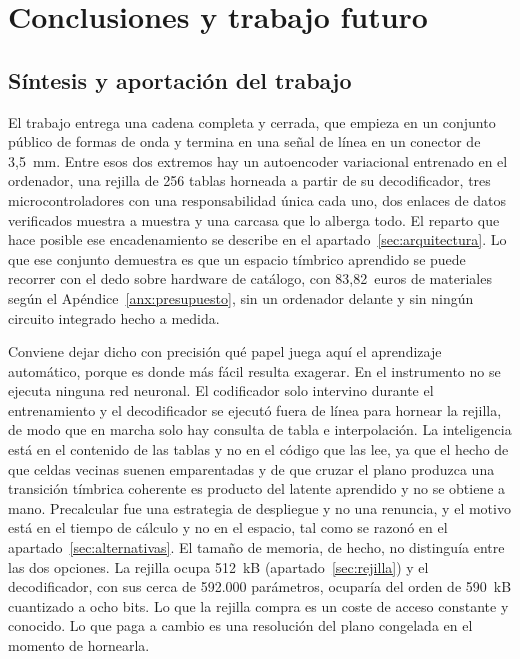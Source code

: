 \chapter{Conclusiones y trabajo futuro}
\label{cap:conclusiones}

\section{Síntesis y aportación del trabajo}
\hypertarget{RE3.2}{}\label{RE3.2}

El trabajo entrega una cadena completa y cerrada, que empieza en un conjunto
público de formas de onda y termina en una señal de línea en un conector de
3,5~mm. Entre esos dos extremos hay un autoencoder variacional entrenado en el
ordenador, una rejilla de 256 tablas horneada a partir
de su decodificador, tres microcontroladores con una responsabilidad única cada
uno, dos enlaces de datos verificados muestra a muestra y una carcasa que lo
alberga todo. El reparto que hace posible ese encadenamiento se describe en el
apartado~\ref{sec:arquitectura}. Lo que ese conjunto demuestra es que un espacio
tímbrico aprendido se puede recorrer con el dedo sobre hardware de catálogo, con
83,82~euros de materiales según el Apéndice~\ref{anx:presupuesto}, sin un
ordenador delante y sin ningún circuito integrado hecho a medida.

Conviene dejar dicho con precisión qué papel juega aquí el aprendizaje
automático, porque es donde más fácil resulta exagerar. En el instrumento no se
ejecuta ninguna red neuronal. El codificador solo intervino durante el
entrenamiento y el decodificador se ejecutó fuera de línea para hornear la
rejilla, de modo que en marcha solo hay consulta de tabla e interpolación. La
inteligencia está en el contenido de las tablas y no en el código que las lee,
ya que el hecho de que celdas vecinas suenen emparentadas y de que cruzar el
plano produzca una transición tímbrica coherente es producto del latente
aprendido y no se obtiene a mano. Precalcular fue una estrategia de despliegue y
no una renuncia, y el motivo está en el tiempo de cálculo y no en el espacio,
tal como se razonó en el apartado~\ref{sec:alternativas}. El tamaño de memoria, de hecho,
no distinguía entre las dos opciones. La rejilla ocupa 512~kB
(apartado~\ref{sec:rejilla}) y el decodificador, con sus cerca de 592.000
parámetros, ocuparía del orden de 590~kB cuantizado a ocho bits. Lo que la
rejilla compra es un coste de acceso constante y conocido. Lo que paga a cambio
es una resolución del plano congelada en el momento de hornearla.

